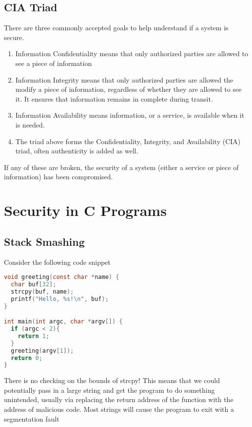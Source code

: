 
\subsection{CIA Triad}

There are three commonly accepted goals to help understand if a system is secure.

\begin{enumerate}
\item Information Confidentiality means that only authorized parties are allowed to see a piece of information
\item Information Integrity means that only authorized parties are allowed the modify a piece of information, regardless of whether they are allowed to see it.
  It ensures that information remains in complete during transit.
\item Information Availability means information, or a service, is available when it is needed.
\item The triad above forms the Confidentiality, Integrity, and Availability (CIA) triad, often authenticity is added as well.
\end{enumerate}

If any of these are broken, the security of a system (either a service or piece of information) has been compromised.

\section{Security in C Programs}

\subsection{Stack Smashing}

Consider the following code snippet

\begin{lstlisting}[language=C]
void greeting(const char *name) {
  char buf[32];
  strcpy(buf, name);
  printf("Hello, %s!\n", buf);
}

int main(int argc, char *argv[]) {
  if (argc < 2){
    return 1;
  }
  greeting(argv[1]);
  return 0;
}
\end{lstlisting}

There is no checking on the bounds of strcpy!
This means that we could potentially pass in a large string and get the program to do something unintended, usually via replacing the return address of the function with the address of malicious code.
Most strings will cause the program to exit with a segmentation fault

